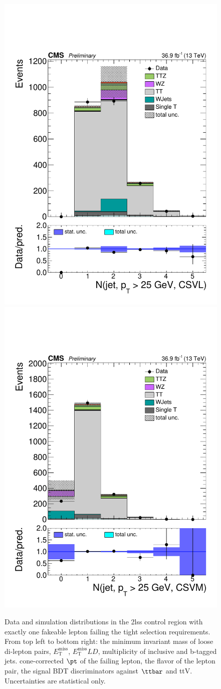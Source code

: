 \begin{figure}[!htb]
\includegraphics[width=0.30\linewidth]{plots_controlregions/2lss_appl_1fo_data/nBJetLoose25.pdf}
\includegraphics[width=0.30\linewidth]{plots_controlregions/2lss_appl_1fo_data/nBJetMedium25.pdf}\\
\caption{Data and simulation distributions in the 2lss control region with exactly one fakeable lepton failing the tight selection requirements.
From top left to bottom right: the minimum invariant mass of loose di-lepton pairs, $E_\mathrm{T}^\mathrm{miss}$, $E_\mathrm{T}^\mathrm{miss}LD$, multiplicity of inclusive and b-tagged jets.
cone-corrected $\pt$ of the failing lepton, the flavor of the lepton pair, the signal BDT discriminators against $\ttbar$ and ttV.
Uncertainties are statistical only.
}
\label{fig:cr_2lss_appl_1fo_2}
\end{figure}

